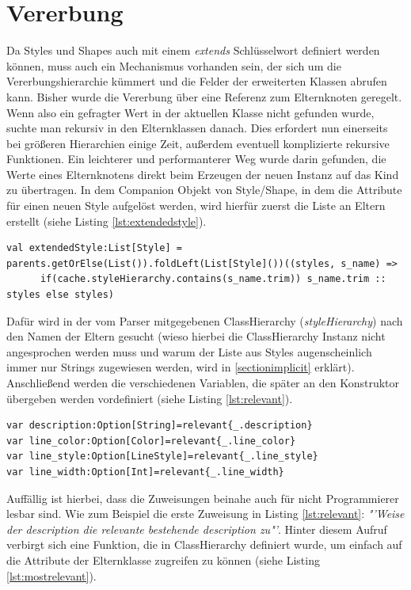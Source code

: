 \section{Vererbung}\label{sectionInheritance}
Da Styles und Shapes auch mit einem \textit{extends} Schlüsselwort definiert werden können, muss auch ein Mechanismus vorhanden sein, der sich um die Vererbungshierarchie kümmert und die Felder der erweiterten Klassen abrufen kann.
Bisher wurde die Vererbung über eine Referenz zum Elternknoten geregelt. Wenn also ein gefragter Wert in der aktuellen Klasse nicht gefunden wurde, suchte man rekursiv in den Elternklassen danach.
Dies erfordert nun einerseits bei größeren Hierarchien einige Zeit, außerdem eventuell komplizierte rekursive Funktionen.
Ein leichterer und performanterer Weg wurde darin gefunden, die Werte eines Elternknotens direkt beim Erzeugen der neuen Instanz auf das Kind zu übertragen.
In dem Companion Objekt von Style/Shape, in dem die Attribute für einen neuen Style aufgelöst werden, wird hierfür zuerst die Liste an Eltern erstellt (siehe Listing \ref{lst:extendedstyle}).
\begin{lstlisting}[style=scala, caption = {Auszug aus Code sammeln der Elterninstanzen}, label = {lst:extendedstyle}]
val extendedStyle:List[Style] = parents.getOrElse(List()).foldLeft(List[Style]())((styles, s_name) =>
      if(cache.styleHierarchy.contains(s_name.trim)) s_name.trim :: styles else styles)
\end{lstlisting}Dafür wird in der vom Parser mitgegebenen ClassHierarchy (\textit{styleHierarchy}) nach den Namen der Eltern gesucht (wieso hierbei die ClassHierarchy Instanz nicht angesprochen werden muss und warum der Liste aus Styles augenscheinlich immer nur Strings zugewiesen werden, wird in \ref{sectionimplicit} erklärt).
Anschließend werden die verschiedenen Variablen, die später an den Konstruktor übergeben werden vordefiniert (siehe Listing \ref{lst:relevant}).
\begin{lstlisting}[style=scala, caption = {Auszug aus Code Zuweisung der Felder der Elternelemente}, label = {lst:relevant}]
var description:Option[String]=relevant{_.description}
var line_color:Option[Color]=relevant{_.line_color}
var line_style:Option[LineStyle]=relevant{_.line_style}
var line_width:Option[Int]=relevant{_.line_width}
\end{lstlisting}Auffällig ist hierbei, dass die Zuweisungen beinahe auch für nicht Programmierer lesbar sind. Wie zum Beispiel die erste Zuweisung in Listing \ref{lst:relevant}: \textit{"'Weise der description die relevante bestehende description zu"'}. Hinter diesem Aufruf verbirgt sich eine Funktion, die in ClassHierarchy definiert wurde, um einfach auf die Attribute der Elternklasse zugreifen zu können (siehe Listing \ref{lst:mostrelevant}).
